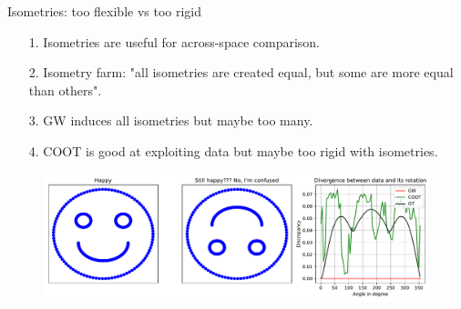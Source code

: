 \documentclass{beamer}
\begin{document}
\begin{frame}{Isometries: too flexible vs too rigid}
\scriptsize

\begin{enumerate}
  \item[1.] Isometries are useful for across-space comparison.
  \item[2.] Isometry farm: "all isometries are created equal, but some are more equal than others".
  \item[3.] GW induces all isometries but maybe too many.
  \item[4.] COOT is good at exploiting data but maybe too rigid with isometries.
\end{enumerate}
\begin{figure}
    \centering
    \includegraphics[width=1.05\linewidth, keepaspectratio=true]{OT_new/div_vs_angle.pdf}
\end{figure}

\end{frame}
\end{document}
